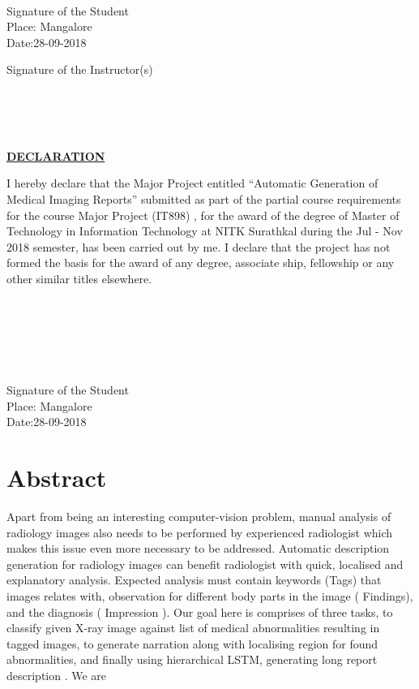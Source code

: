 \documentclass[12pt]{article}
\numberwithin{figure}{section}
\begin{document}
\\
\\
\\
\\
\\
\\
\begin{minipage}{0.4\textwidth}
\begin{flushleft}
Signature of the Student\\
Place: Mangalore\\ 
Date:28-09-2018\\
\end{flushleft}
\end{minipage}
\begin{minipage}{0.4\textwidth}
\begin{flushright}
Signature of the Instructor(s)\\
\end{flushright}
\end{minipage}
\\
\\
\\
\clearpage
\thispagestyle{empty}
\begin{center}
\underline{\textbf{DECLARATION}}\\
\end{center}
\null
I hereby declare that the Major Project entitled “Automatic Generation of Medical Imaging Reports” submitted as part of the partial course requirements for the course Major Project (IT898) , for the award of the degree of Master of Technology in Information Technology at NITK Surathkal during the Jul - Nov 2018 semester, has been carried out by me. I declare that the project has not formed the basis for the award of any degree, associate ship, fellowship or any other similar titles elsewhere.\\ 
\\
\\
\\
\\
\\
\\
Signature of the Student\\
Place: Mangalore\\
Date:28-09-2018\\
\clearpage
{}
\section*{Abstract}
Apart from being an interesting computer-vision problem, manual analysis of radiology images also needs to be performed by experienced radiologist which makes this issue even more necessary to be addressed. Automatic description generation for radiology images can benefit radiologist with quick, localised and explanatory analysis. Expected analysis must contain keywords (Tags) that images relates with, observation for different body parts in the image ( Findings), and the diagnosis ( Impression ).
Our goal here is comprises of three tasks, to classify given X-ray image against list of medical abnormalities resulting in tagged images, to generate narration along with localising region for found abnormalities, and finally using hierarchical LSTM, generating long report description .
We are 
\end{document}
